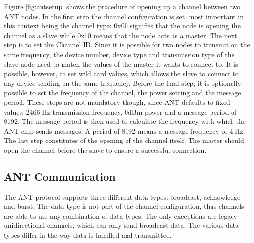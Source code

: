 Figure \ref{fig:antsetup} shows the procedure of opening up a channel between two ANT nodes. In the first step the channel configuration is set, most important in this context being the channel type: 0x00 signifies that the node is opening the channel as a slave while 0x10 means that the node acts as a master. The next step is to set the Channel ID. Since it is possible for two nodes to transmit on the same frequency, the device number, device type and transmission type of the slave node need to match the values of the master it wants to connect to. It is possible, however, to set wild card values, which allows the slave to connect to any device sending on the same frequency. Before the final step, it is optionally possible to set the frequency of the channel, the power setting and the message period. These steps are not mandatory though, since ANT defaults to fixed values: 2466 Hz transmission frequency, 0dBm power and a message period of 8192. The message period is then used to calculate the frequency with which the ANT chip sends messages. A period of 8192 means a message frequency of 4 Hz. The last step constitutes of the opening of the channel itself. The master should open the channel before the slave to ensure a successful connection.

\subsection{ANT Communication}

The ANT protocol supports three different data types: broadcast, acknowledge and burst. The data type is not part of the channel configuration, thus channels are able to use any combination of data types. The only exceptions are legacy unidirectional channels, which can only send broadcast data. The various data types differ in the way data is handled and transmitted.

